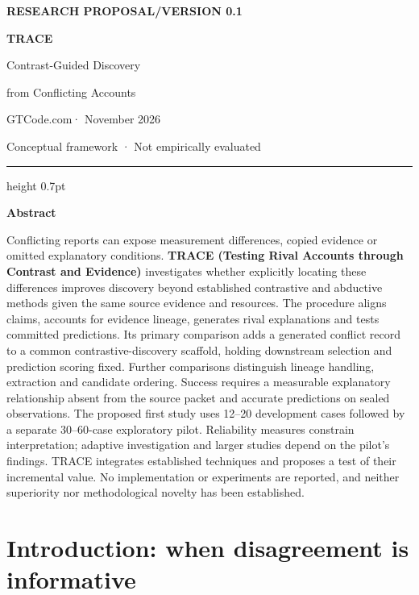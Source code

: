 \documentclass[11pt,a4paper]{article}
\renewenvironment{abstract}{%
  \par\vspace{1.1em}%
  {\sffamily\bfseries\color{CNSInk} Abstract\par}%
  \vspace{0.35em}\small\setlength{\parindent}{0pt}\noindent\ignorespaces
}{\par\vspace{0.9em}\normalsize}
\begin{document}
\thispagestyle{opening}
\begingroup
\raggedright
{\small\sffamily\bfseries\color{CNSBlue} RESEARCH PROPOSAL\enspace /\enspace VERSION 0.1\par}
\vspace{1em}
{\fontsize{27}{31}\selectfont\bfseries TRACE\par}
\vspace{0.55em}
{\Large Contrast-Guided Discovery\par}
\vspace{0.18em}
{\large from Conflicting Accounts\par}
\vspace{0.9em}
{\normalsize\sffamily GTCode.com\enspace · November 2026\par}
\vspace{0.55em}
{\small\sffamily\color{CNSMuted} Conceptual framework · Not empirically evaluated\par}
\endgroup
\vspace{0.8em}
{\color{CNSBlue}\hrule height 0.7pt}
\begin{abstract}
Conflicting reports can expose measurement differences, copied evidence
or omitted explanatory conditions. \textbf{TRACE (Testing Rival Accounts
through Contrast and Evidence)} investigates whether explicitly locating
these differences improves discovery beyond established contrastive and
abductive methods given the same source evidence and resources. The
procedure aligns claims, accounts for evidence lineage, generates rival
explanations and tests committed predictions. Its primary comparison
adds a generated conflict record to a common contrastive-discovery
scaffold, holding downstream selection and prediction scoring fixed.
Further comparisons distinguish lineage handling, extraction and
candidate ordering. Success requires a measurable explanatory
relationship absent from the source packet and accurate predictions on
sealed observations. The proposed first study uses 12--20 development
cases followed by a separate 30--60-case exploratory pilot. Reliability
measures constrain interpretation; adaptive investigation and larger
studies depend on the pilot's findings. TRACE integrates established
techniques and proposes a test of their incremental value. No
implementation or experiments are reported, and neither superiority nor
methodological novelty has been established.
\end{abstract}

\section{Introduction: when disagreement is
informative}\label{introduction-when-disagreement-is-informative}
\end{document}
